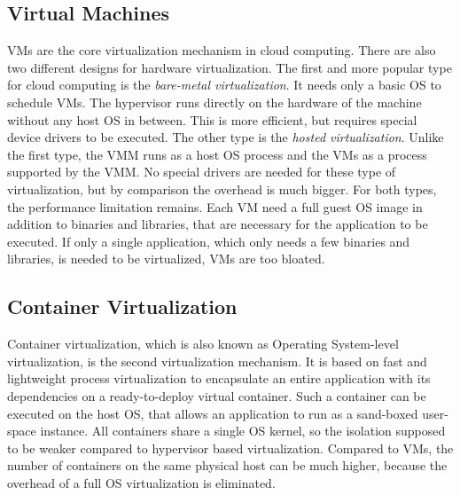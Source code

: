 \subsection{Virtual Machines}
\acp{VM} are the core virtualization mechanism in cloud computing.
There are also two different designs for hardware virtualization.
The first and more popular type for cloud computing is the \textit{bare-metal virtualization}.
It needs only a basic OS to schedule \acp{VM}.
The hypervisor runs directly on the hardware of the machine without any host \ac{OS} in between.\autocite[cf.][p. 14 f.]{Chirammal:2016}
This is more efficient, but requires special device drivers to be executed.\autocite[cf.][p. 14 f.]{Chirammal:2016}
The other type is the \textit{hosted virtualization}.
Unlike the first type, the \ac{VMM} runs as a host \ac{OS} process and the \acp{VM} as a process supported by the \ac{VMM}.\autocite[cf.][p. 14 f.]{Chirammal:2016}
No special drivers are needed for these type of virtualization, but by comparison the overhead is much bigger.\autocite[cf.][p. 14 f.]{Chirammal:2016}
For both types, the performance limitation remains.
Each \ac{VM} need a full guest \ac{OS} image in addition to binaries and libraries, that are necessary for the application to be executed.\autocite[cf.][p. 381]{Pahl:2015}
If only a single application, which only needs a few binaries and libraries, is needed to be virtualized, \acp{VM} are too bloated.


\subsection{Container Virtualization}
Container virtualization, which is also known as Operating System-level virtualization, is the second virtualization mechanism.
It is based on fast and lightweight process virtualization to encapsulate an entire application with its dependencies on a ready-to-deploy virtual container.\autocite[cf.][p. 72]{Tosatto:2015}
Such a container can be executed on the host \ac{OS}, that allows an application to run as a sand-boxed user-space instance.\autocite[cf.][p. 1]{Anderson:2016}
All containers share a single \ac{OS} kernel, so the isolation supposed to be weaker compared to hypervisor based virtualization.\autocite[cf.][p. 2]{Celesti:2016}
Compared to \acp{VM}, the number of containers on the same physical host can be much higher, because the overhead of a full \ac{OS} virtualization is eliminated.\autocite[cf.][p. 2]{Celesti:2016}


